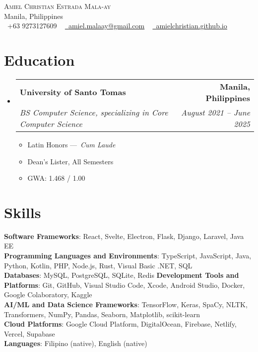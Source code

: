 \documentclass[letterpaper,11pt]{article}
\makeatletter
\newcommand{\resumeItem}[1]{
  \item\small{
    {#1 \vspace{-2pt}}
  }
}
\newcommand{\resumeSubheading}[4]{
  \vspace{-2pt}\item
    \begin{tabular*}{1.0\textwidth}[t]{l@{\extracolsep{\fill}}r}
      \textbf{#1} & \textbf{\small #2} \\
      \textit{\small#3} & \textit{\small #4} \\
    \end{tabular*}\vspace{-7pt}
}
\newcommand{\resumeSubHeadingListStart}{\begin{itemize}[leftmargin=0.0in, label={}]}
\newcommand{\resumeSubHeadingListEnd}{\end{itemize}}
\newcommand{\resumeItemListStart}{\begin{itemize}}
\newcommand{\resumeItemListEnd}{\end{itemize}\vspace{-5pt}}
\makeatother
\begin{document}
\begin{center}
    {\Huge \scshape Amiel Christian Estrada Mala-ay} \\ \vspace{1pt}
    Manila, Philippines \\ \vspace{1pt}
    \small \raisebox{-0.1\height}\faPhone\ +63 9273127609 ~ \href{mailto:amiel.malaay@gmail.com}{\raisebox{-0.2\height}\faEnvelope\  \underline{amiel.malaay@gmail.com}} ~ 
    \href{https://amielchristian.github.io}{\raisebox{-0.2\height}\faGlobe\ \underline{amielchristian.github.io}}
    \vspace{-8pt}
\end{center}

\section{Education}
  \resumeSubHeadingListStart
    \resumeSubheading
      {University of Santo Tomas}{Manila, Philippines}
      {BS Computer Science, specializing in Core Computer Science}{August 2021 -- June 2025}
      \resumeItemListStart
        \resumeItem{Latin Honors —\ \textit{Cum Laude}}
        \resumeItem{Dean's Lister, All Semesters}
        \resumeItem{GWA: 1.468 / 1.00}
      \resumeItemListEnd
  \resumeSubHeadingListEnd

\section{Skills}
 \begin{itemize}[leftmargin=0.15in, label={}]
    \small{\item{
     \textbf{Software Frameworks}{: React, Svelte, Electron, Flask, Django, Laravel, Java EE} \\
     \textbf{Programming Languages and Environments}{: TypeScript, JavaScript, Java, Python, Kotlin, PHP, Node.js, Rust, Visual Basic .NET, SQL} \\
     \textbf{Databases}{: MySQL, PostgreSQL, SQLite, Redis}
     \textbf{Development Tools and Platforms}{: Git, GitHub, Visual Studio Code, Xcode, Android Studio, Docker, Google Colaboratory, Kaggle} \\
     \textbf{AI/ML and Data Science Frameworks}{: TensorFlow, Keras, SpaCy, NLTK, Transformers, NumPy, Pandas, Seaborn, Matplotlib, scikit-learn} \\
     \textbf{Cloud Platforms}{: Google Cloud Platform, DigitalOcean, Firebase, Netlify, Vercel, Supabase} \\
     \textbf{Languages}{: Filipino (native), English (native)}
    }}
 \end{itemize}
\end{document}
